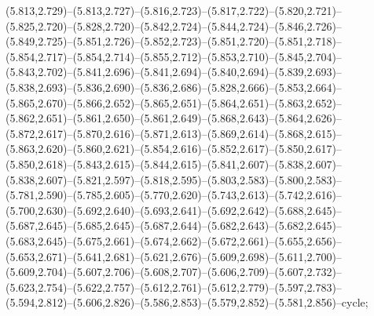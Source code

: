 (5.813,2.729)--(5.813,2.727)--(5.816,2.723)--(5.817,2.722)--(5.820,2.721)--(5.825,2.720)--(5.828,2.720)--(5.842,2.724)--(5.844,2.724)--(5.846,2.726)--(5.849,2.725)--(5.851,2.726)--(5.852,2.723)--(5.851,2.720)--(5.851,2.718)--(5.854,2.717)--(5.854,2.714)--(5.855,2.712)--(5.853,2.710)--(5.845,2.704)--(5.843,2.702)--(5.841,2.696)--(5.841,2.694)--(5.840,2.694)--(5.839,2.693)--(5.838,2.693)--(5.836,2.690)--(5.836,2.686)--(5.828,2.666)--(5.853,2.664)--(5.865,2.670)--(5.866,2.652)--(5.865,2.651)--(5.864,2.651)--(5.863,2.652)--(5.862,2.651)--(5.861,2.650)--(5.861,2.649)--(5.868,2.643)--(5.864,2.626)--(5.872,2.617)--(5.870,2.616)--(5.871,2.613)--(5.869,2.614)--(5.868,2.615)--(5.863,2.620)--(5.860,2.621)--(5.854,2.616)--(5.852,2.617)--(5.850,2.617)--(5.850,2.618)--(5.843,2.615)--(5.844,2.615)--(5.841,2.607)--(5.838,2.607)--(5.838,2.607)--(5.821,2.597)--(5.818,2.595)--(5.803,2.583)--(5.800,2.583)--(5.781,2.590)--(5.785,2.605)--(5.770,2.620)--(5.743,2.613)--(5.742,2.616)--(5.700,2.630)--(5.692,2.640)--(5.693,2.641)--(5.692,2.642)--(5.688,2.645)--(5.687,2.645)--(5.685,2.645)--(5.687,2.644)--(5.682,2.643)--(5.682,2.645)--(5.683,2.645)--(5.675,2.661)--(5.674,2.662)--(5.672,2.661)--(5.655,2.656)--(5.653,2.671)--(5.641,2.681)--(5.621,2.676)--(5.609,2.698)--(5.611,2.700)--(5.609,2.704)--(5.607,2.706)--(5.608,2.707)--(5.606,2.709)--(5.607,2.732)--(5.623,2.754)--(5.622,2.757)--(5.612,2.761)--(5.612,2.779)--(5.597,2.783)--(5.594,2.812)--(5.606,2.826)--(5.586,2.853)--(5.579,2.852)--(5.581,2.856)--cycle;
